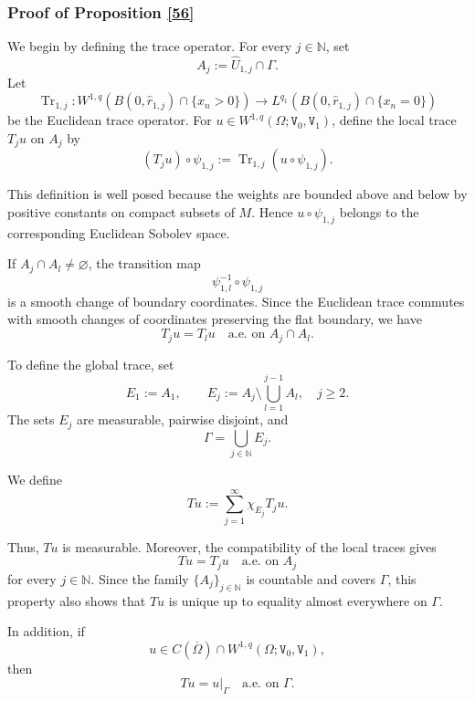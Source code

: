 \documentclass[reqno, 11pt, a4paper]{amsart}
\numberwithin{equation}{section}
\newcommand{\wghtv}{\mathtt{V}}
\newcommand{\qxp}{q}
\begin{document}

\subsubsection{Proof of Proposition \ref{56}}
 
 
 We begin by defining the trace operator. For every
\(j\in\mathbb N\), set
\[
A_j:=\hat U_{1,j}\cap\Gamma.
\]
Let
\[
\operatorname{Tr}_{1,j}:
W^{1,\qxp}
\left(
B(0,\hat r_{1,j})\cap\{x_n>0\}
\right)
\longrightarrow
L^{\qxp_1}
\left(
B(0,\hat r_{1,j})\cap\{x_n=0\}
\right)
\]
be the Euclidean trace operator. For
\(u\in W^{1,\qxp}(\Omega;\wghtv_0,\wghtv_1)\), define the local trace
\(T_j u\) on \(A_j\) by
\[
(T_j u)\circ\psi_{1,j}
:=
\operatorname{Tr}_{1,j}(u\circ\psi_{1,j}).
\]

This definition is well posed because the weights are bounded above
and below by positive constants on compact subsets of \(M\). Hence
\(u\circ\psi_{1,j}\) belongs to the corresponding Euclidean Sobolev
space.

If \(A_j\cap A_l\neq\varnothing\), the transition map
\[
\psi_{1,l}^{-1}\circ\psi_{1,j}
\]
is a smooth change of boundary coordinates. Since the Euclidean trace
commutes with smooth changes of coordinates preserving the flat
boundary, we have
\[
T_j u=T_l u
\quad\text{a.e. on }A_j\cap A_l.
\]

To define the global trace, set
\[
E_1:=A_1,
\qquad
E_j:=A_j\setminus\bigcup_{l=1}^{j-1}A_l,
\quad j\geq2.
\]
The sets \(E_j\) are measurable, pairwise disjoint, and
\[
\Gamma=\bigcup_{j\in\mathbb N}E_j.
\]

We define
\[
Tu:=\sum_{j=1}^{\infty}\chi_{E_j}T_j u.
\]


Thus, \(Tu\) is measurable. Moreover, the compatibility of the local
traces gives
\[
Tu=T_j u
\quad\text{a.e. on }A_j
\]
for every \(j\in\mathbb N\). Since the family
\(\{A_j\}_{j\in\mathbb N}\) is countable and covers \(\Gamma\), this
property also shows that \(Tu\) is unique up to equality almost
everywhere on \(\Gamma\).

In addition, if
\[
u\in C(\overline\Omega)\cap
W^{1,\qxp}(\Omega;\wghtv_0,\wghtv_1),
\]
then
\[
Tu=u|_\Gamma
\quad\text{a.e. on }\Gamma.
\]






\medskip
\end{document}
